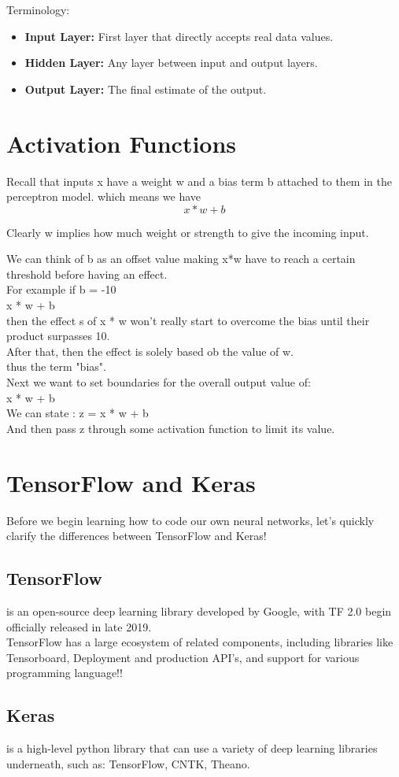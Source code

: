 \documentclass[12pt]{article}
\begin{document}
\Large Terminology:\small
\begin{itemize}
	\item
	\textbf{Input Layer:} First layer that directly accepts real data values.
	\item
	\textbf{Hidden Layer:} Any layer between input and output layers.
	\item
	\textbf{Output Layer:} The final estimate of the output.
\end{itemize}


\section{Activation Functions}

Recall that inputs x have a weight w and a bias term b attached to them in the perceptron model.
which means we have 
\begin{equation}
	x*w+b
\end{equation}

Clearly w implies how much weight or strength to give the incoming input.

We can think of b as an offset value making x*w have to reach a certain threshold before having an effect.\\

For example if b = -10 \\
x * w + b\\
then the effect s of x * w won't really start to overcome the bias until their product surpasses 10.\\
After that, then the effect is solely based ob the value of w.\\
thus the term "bias".\\

 Next we want to set boundaries for the overall output value of:
\\
x * w + b \\
We can state :
z = x * w + b \\
And then pass z through some activation function to limit its value.\\

\section{TensorFlow and Keras}
Before we begin learning how to code our own neural networks, let's quickly clarify the differences between TensorFlow and Keras!

\subsection{TensorFlow}
	is an open-source deep learning library developed by Google, with TF 2.0 begin officially released in late 2019.\\
	TensorFlow has a large ecosystem of related components, including libraries like Tensorboard, Deployment and production API's, and support for various programming language!!

\subsection{Keras}
	is a high-level python library that can use a variety of deep learning libraries underneath, such as: TensorFlow, CNTK, Theano.
\end{document}
